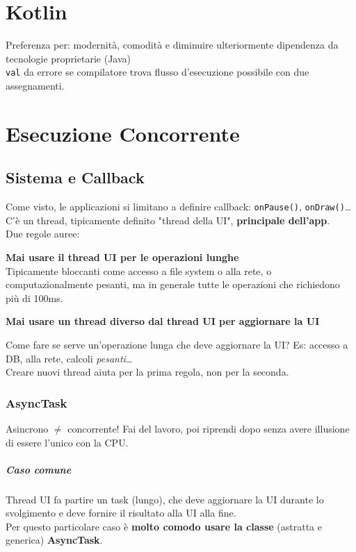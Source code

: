 \documentclass[10pt]{book}
\begin{document}
\chapter{Kotlin}
Preferenza per: modernità, comodità e diminuire ulteriormente dipendenza da tecnologie proprietarie (Java)\\
\texttt{val} da errore se compilatore trova flusso d'esecuzione possibile con due assegnamenti.
\chapter{Esecuzione Concorrente}
\section{Sistema e Callback}
Come visto, le applicazioni si limitano a definire callback: \texttt{onPause()}, \texttt{onDraw()}\ldots\\
C'è un thread, tipicamente definito "thread della UI", \textbf{principale dell'app}.\\
Due regole auree:
\begin{list}{!}{}
	\item \textbf{Mai usare il thread UI per le operazioni lunghe}\\
	Tipicamente bloccanti come accesso a file system o alla rete, o computazionalmente pesanti, ma in generale tutte le operazioni che richiedono più di 100ms.
	\item \textbf{Mai usare un thread diverso dal thread UI per aggiornare la UI}
\end{list}
Come fare se serve un'operazione lunga che deve aggiornare la UI? Es: accesso a DB, alla rete, calcoli \textit{pesanti}\ldots\\
Creare nuovi thread aiuta per la prima regola, non per la seconda.
\subsection{AsyncTask}
Asincrono $\neq$ concorrente!
Fai del lavoro, poi riprendi dopo senza avere illusione di essere l'unico con la CPU.
\paragraph{Caso comune} Thread UI fa partire un task (lungo), che deve aggiornare la UI durante lo svolgimento e deve fornire il risultato alla UI alla fine.\\
Per questo particolare caso è \textbf{molto comodo usare la classe} (astratta e generica) \textbf{AsyncTask}.
\end{document}
